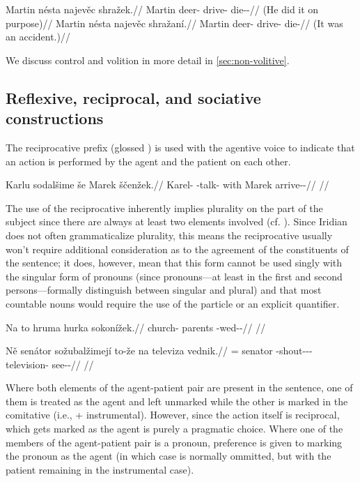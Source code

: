 \pex
\a
\begingl
	\gla Martin nésta najevěc shražek.//
	\glb Martin deer-\Acc{} drive-\Cv{} die-\Av{}-\Pf{}//
	\glft {} (He did it on purpose)//
\endgl
\a
\begingl
	\gla Martin nésta najevěc shražaní.//
	\glb Martin deer-\Acc{} drive-\Cv{} die-//
	\glft {} (It was an accident.)//
\endgl
\xe

We discuss control and volition in more detail in \ref{sec:non-volitive}.

\subsection{Reflexive, reciprocal, and sociative constructions}

The reciprocative prefix  (glossed \Rec{}) is used with the agentive
voice to indicate that an action is performed by the agent and the patient on
each other.

\pex
\begingl
\gla Karlu sodalšime še Marek ščenžek.//
\glb Karel-\Ins{} \Rec{}-talk- with Marek arrive-\Av{}-\Pf{}//
\glft {}//
\endgl
\xe

The use of the reciprocative inherently implies plurality on the part of the
subject since there are always at least two elements involved (cf.
\cite[255]{tesniere1965}). Since Iridian does not often grammaticalize
plurality, this means the reciprocative usually won't require
additional consideration as to the agreement of the constituents of the
sentence; it does, however, mean that this form cannot be used singly with the
singular form of pronouns (since pronouns---at least in the first and second
persons---formally distinguish between singular and plural) and that most
countable nouns would require the use of the particle  or an explicit
quantifier.

\pex
\begingl
\gla Na to hruma hurka sokonížek.//
\glb \Loc{} \Dem{} church-\Acc{} parents \Rec{}-wed-\Av{}-\Pf{}//
\glft {}//
\endgl
\xe

\pex
\begingl
\gla Ně senátor sožubalžimejí to-že na televiza vednik.//
\glb \Pl{}= senator \Rec{}-shout-\Av{}-\Prog{}-\Quot{} \Qp{} \Loc{} television-\Acc{} see-\Pv{}-\Pf{}//
\glft {}//
\endgl
\xe

Where both elements of the agent-patient pair are present in the sentence, one
of them is treated as the agent and left unmarked while the other is marked in
the comitative (i.e.,  + instrumental). However, since
the action itself is reciprocal, which gets marked as the agent is purely a
pragmatic choice. Where one of the members of the agent-patient pair is a
pronoun, preference is given to marking the pronoun as the agent (in which case
 is normally ommitted, but with the patient remaining in the
instrumental case).

